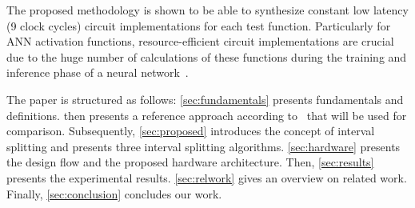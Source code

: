 \begin{itemize}
The proposed methodology is shown to be able to synthesize constant low latency (9 clock cycles) circuit implementations for each test function.
Particularly for \ac{ANN} activation functions, resource-efficient circuit implementations are crucial due to the huge number of calculations of these functions during the training and inference phase of a neural network~\cite{Pouyanfar:2018,Alom:2019}.
\end{itemize}
The paper is structured as follows:
\cref{sec:fundamentals} presents fundamentals and definitions.
 then presents a reference approach according to~\cite{MATLAB:reference} that will be used for comparison.
Subsequently, \cref{sec:proposed} introduces the concept of interval splitting and presents three interval splitting algorithms.
\cref{sec:hardware} presents the design flow and the proposed hardware architecture.
Then, \cref{sec:results} presents the experimental results.
\cref{sec:relwork} gives an overview on related work.
Finally, \cref{sec:conclusion} concludes our work.
